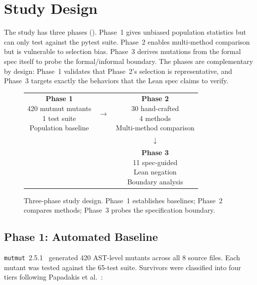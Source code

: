 \documentclass[11pt,a4paper]{article}
\begin{document}
\section{Study Design}
\label{sec:method}

The study has three phases (). Phase~1 gives
unbiased population statistics but can only test against the pytest
suite. Phase~2 enables multi-method comparison but is vulnerable to
selection bias. Phase~3 derives mutations from the formal spec itself
to probe the formal/informal boundary. The phases are complementary
by design: Phase~1 validates that Phase~2's selection is
representative, and Phase~3 targets exactly the behaviors that the
Lean spec claims to verify.

\begin{figure}[htbp]
\centering
\begin{tabular}{@{}ccc@{}}
\fbox{\parbox{3.8cm}{\centering\textbf{Phase 1}\\420 mutmut mutants\\1 test suite\\Population baseline}} &
$\longrightarrow$ &
\fbox{\parbox{3.8cm}{\centering\textbf{Phase 2}\\30 hand-crafted\\4 methods\\Multi-method comparison}} \\[1.5em]
& & $\downarrow$ \\[0.5em]
& &
\fbox{\parbox{3.8cm}{\centering\textbf{Phase 3}\\11 spec-guided\\Lean negation\\Boundary analysis}} \\
\end{tabular}
\caption{Three-phase study design. Phase~1 establishes baselines;
Phase~2 compares methods; Phase~3 probes the specification boundary.}
\label{fig:phases}
\end{figure}

\subsection{Phase 1: Automated Baseline}

\texttt{mutmut}~2.5.1~\cite{mutmut2024} generated 420 AST-level
mutants across all 8 source files. Each mutant was tested against the
65-test suite. Survivors were classified into four tiers following
Papadakis et al.~\cite{papadakis2019mutation}:
\end{document}
